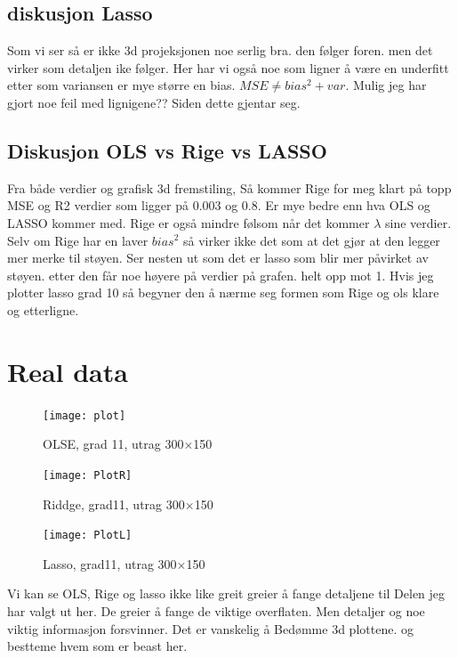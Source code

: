\documentclass[norsk,a4paper,12pt]{article}
\begin{document}
\subsection*{diskusjon Lasso}
Som vi ser så er ikke 3d projeksjonen noe serlig bra. den følger foren. men det virker som detaljen ike følger. Her har vi også noe som ligner å være en underfitt etter som variansen er mye større en bias. $MSE\neq bias^{2} + var $. Mulig jeg har gjort noe feil med lignigene?? Siden dette gjentar seg.
\subsection*{Diskusjon OLS vs Rige vs LASSO}
Fra både verdier og grafisk 3d fremstiling, Så kommer Rige for meg klart på topp MSE og R2 verdier som ligger på 0.003 og 0.8. Er mye bedre enn hva OLS og LASSO kommer med. Rige er også mindre følsom når det kommer $\lambda$ sine verdier. Selv om Rige har en laver $bias^2$ så virker ikke det som at det gjør at den legger mer merke til støyen. Ser nesten ut som det er lasso som blir mer påvirket av støyen. etter den får noe høyere på verdier på grafen. helt opp mot 1. Hvis jeg plotter lasso grad 10 så begyner den å nærme seg formen som Rige og ols klare og etterligne.

\section*{Real data}
\begin{figure}[H]
\texttt{[image: plot]}
\caption{OLSE, grad 11, utrag 300$\times$150 }
\end{figure}
\begin{figure}[H]
\texttt{[image: PlotR]}
\caption{Riddge, grad11, utrag 300$\times$150  }
\end{figure}

\begin{figure}[H]
\texttt{[image: PlotL]}
\caption{Lasso, grad11, utrag 300$\times$150 }
\end{figure}
Vi kan se OLS, Rige og lasso ikke like greit greier å fange detaljene til Delen jeg har valgt ut her. De greier å fange de viktige overflaten. Men detaljer og noe viktig informasjon forsvinner. Det er vanskelig å Bedømme 3d plottene. og bestteme hvem som er beast her.
\end{document}
